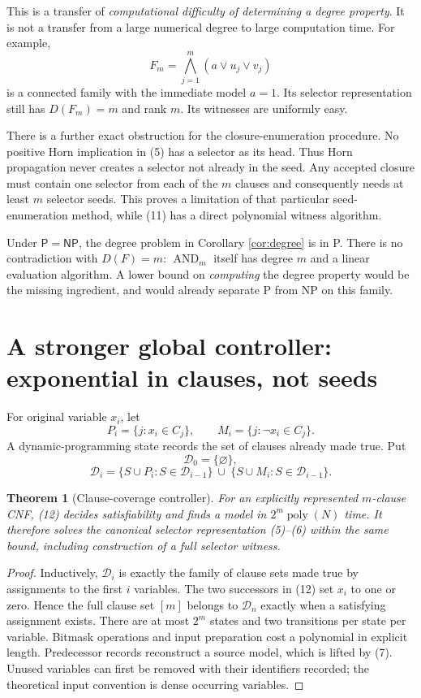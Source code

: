 \documentclass[11pt]{article}
\newtheorem{theorem}{Theorem}
\newcommand{\poly}{\operatorname{poly}}
\begin{document}
This is a transfer of \emph{computational difficulty of determining a
degree property}. It is not a transfer from a large numerical degree
to large computation time.
For example,
\[
 F_m=\bigwedge_{j=1}^m(a\vee u_j\vee v_j)
 \tag{11}
\]
is a connected family with the immediate model $a=1$.
Its selector representation still has $D(F_m)=m$ and rank $m$.
Its witnesses are uniformly easy.

There is a further exact obstruction for the closure-enumeration
procedure. No positive Horn implication in (5) has a selector as its
head. Thus Horn propagation never creates a selector not already
in the seed. Any accepted closure must contain one selector from each
of the $m$ clauses and consequently needs at least $m$ selector seeds.
This proves a limitation of that particular seed-enumeration method,
while (11) has a direct polynomial witness algorithm.

Under $\mathsf P=\mathsf{NP}$, the degree problem in
Corollary \ref{cor:degree} is in P. There is no contradiction with
$D(F)=m$: $\operatorname{AND}_m$ itself has degree $m$ and a linear
evaluation algorithm. A lower bound on \emph{computing} the degree
property would be the missing ingredient, and would already separate
P from NP on this family.

\section{A stronger global controller: exponential in clauses, not seeds}
For original variable $x_i$, let
\[
 P_i=\{j:x_i\in C_j\},\qquad
 M_i=\{j:\neg x_i\in C_j\}.
\]
A dynamic-programming state records the set of clauses already made
true. Put
\[
 \mathcal D_0=\{\varnothing\},
\]
\[
 \mathcal D_i=
 \{S\cup P_i:S\in\mathcal D_{i-1}\}
 \ \cup\
 \{S\cup M_i:S\in\mathcal D_{i-1}\}.
 \tag{12}
\]

\begin{theorem}[Clause-coverage controller]\label{thm:dp}
For an explicitly represented $m$-clause CNF, (12) decides
satisfiability and finds a model in $2^m\poly(N)$ time.
It therefore solves the canonical selector representation (5)--(6)
within the same bound, including construction of a full selector witness.
\end{theorem}

\begin{proof}
Inductively, $\mathcal D_i$ is exactly the family of clause sets made
true by assignments to the first $i$ variables. The two successors
in (12) set $x_i$ to one or zero. Hence the full clause set $[m]$
belongs to $\mathcal D_n$ exactly when a satisfying assignment exists.
There are at most $2^m$ states and two transitions per state per
variable. Bitmask operations and input preparation cost a polynomial
in explicit length. Predecessor records reconstruct a source model,
which is lifted by (7).
Unused variables can first be removed with their identifiers recorded;
the theoretical input convention is dense occurring variables.
\end{proof}
\end{document}
